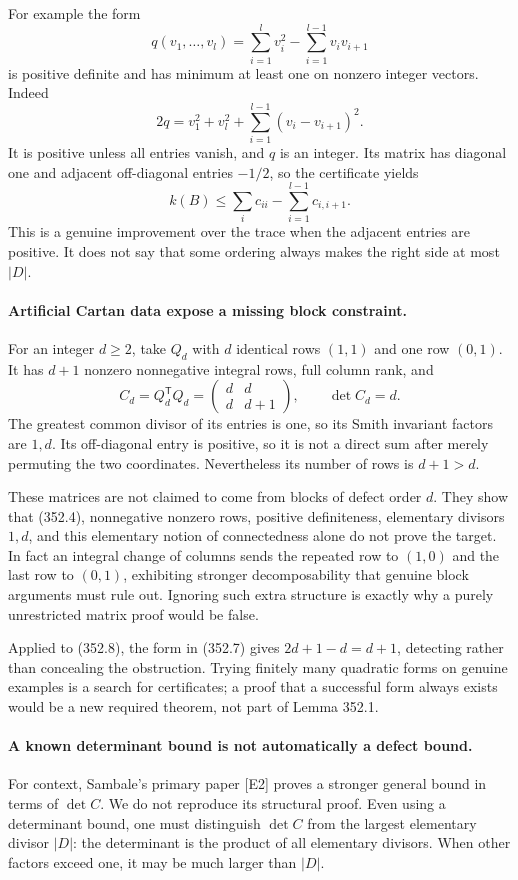 \documentclass[11pt]{article}
\begin{document}
For example the form
\[
 q(v_1,\ldots,v_l)=\sum_{i=1}^l v_i^2
                         -\sum_{i=1}^{l-1}v_i v_{i+1}
\]
is positive definite and has minimum at least one on nonzero integer
vectors. Indeed
\[
 2q=v_1^2+v_l^2+\sum_{i=1}^{l-1}(v_i-v_{i+1})^2.
\]
It is positive unless all entries vanish, and $q$ is an integer.
Its matrix has diagonal one and adjacent off-diagonal entries $-1/2$,
so the certificate yields
\[
 k(B)\le\sum_i c_{ii}-\sum_{i=1}^{l-1}c_{i,i+1}.
 \tag{352.7}
\]
This is a genuine improvement over the trace when the adjacent entries
are positive. It does not say that some ordering always makes the
right side at most $|D|$.

\paragraph{Artificial Cartan data expose a missing block constraint.}
For an integer $d\ge2$, take $Q_d$ with $d$ identical rows $(1,1)$
and one row $(0,1)$. It has $d+1$ nonzero nonnegative integral rows,
full column rank, and
\[
 C_d=Q_d^{\mathsf T}Q_d
     =\begin{pmatrix}d&d\\d&d+1\end{pmatrix},
 \qquad\det C_d=d.
 \tag{352.8}
\]
The greatest common divisor of its entries is one, so its Smith
invariant factors are $1,d$. Its off-diagonal entry is positive,
so it is not a direct sum after merely permuting the two coordinates.
Nevertheless its number of rows is $d+1>d$.

These matrices are not claimed to come from blocks of defect order
$d$. They show that (352.4), nonnegative nonzero rows, positive
definiteness, elementary divisors $1,d$, and this elementary notion
of connectedness alone do not prove the target. In fact an integral
change of columns sends the repeated row to $(1,0)$ and the last row
to $(0,1)$, exhibiting stronger decomposability that genuine block
arguments must rule out. Ignoring such extra structure is exactly
why a purely unrestricted matrix proof would be false.

Applied to (352.8), the form in (352.7) gives
$2d+1-d=d+1$, detecting rather than concealing the obstruction.
Trying finitely many quadratic forms on genuine examples is a search
for certificates; a proof that a successful form always exists would
be a new required theorem, not part of Lemma 352.1.

\paragraph{A known determinant bound is not automatically a defect bound.}
For context, Sambale's primary paper [E2] proves a stronger general
bound in terms of $\det C$. We do not reproduce its structural proof.
Even using a determinant bound, one must distinguish
$\det C$ from the largest elementary divisor $|D|$: the determinant
is the product of all elementary divisors. When other factors exceed
one, it may be much larger than $|D|$.
\end{document}
